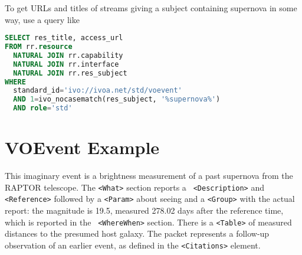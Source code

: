 \documentclass[11pt,a4paper]{ivoa}
\begin{document}
To get URLs and titles of streams giving a subject containing supernova
in some way, use a query like

\begin{lstlisting}[language=SQL]
SELECT res_title, access_url
FROM rr.resource
  NATURAL JOIN rr.capability
  NATURAL JOIN rr.interface
  NATURAL JOIN rr.res_subject
WHERE
  standard_id='ivo://ivoa.net/std/voevent'
  AND 1=ivo_nocasematch(res_subject, '%supernova%')
  AND role='std'
\end{lstlisting}

\section{VOEvent Example}
\label{sec:4}
This imaginary event is a brightness measurement of a past supernova from the
RAPTOR \citep{bib10} telescope. The {\tt <What>} section reports a {\tt
<Description>} and {\tt <Reference>} followed by a {\tt <Param>} about seeing
and a {\tt <Group>} with the actual report: the magnitude is 19.5, measured
278.02 days after the reference time, which is reported in the {\tt
<WhereWhen>} section. There is a {\tt <Table>} of measured distances to the
presumed host galaxy. The packet represents a follow-up observation of an
earlier event, as defined in the {\tt <Citations>} element.
\end{document}
